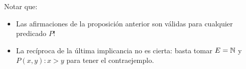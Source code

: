 Notar que: 
\begin{itemize}
	\item Las afirmaciones de la proposición anterior son válidas para cualquier predicado $P$! 
	\item La recíproca de la última implicancia no es cierta: basta tomar $E = \mathbb{N}$ y $P(x,y): x > y$ para tener el contraejemplo. 
\end{itemize}